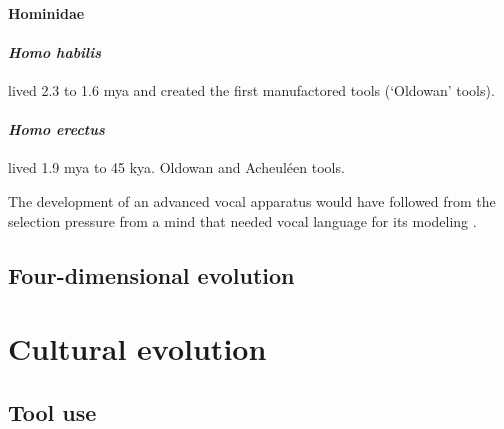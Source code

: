 \documentclass{article}
\begin{document}
\paragraph{Hominidae}

\paragraph{\textit{Homo habilis}} lived 2.3 to 1.6 mya and created the first manufactored tools (`Oldowan' tools).

\paragraph{\textit{Homo erectus}} lived 1.9 mya to 45 kya.
Oldowan and Acheuléen tools.

The development of an advanced vocal apparatus would have followed from the selection pressure from a mind that needed vocal language for its modeling \citep[p.220]{donald1991}.

\subsection{Four-dimensional evolution}

\citet{jablonka2007}


\section{Cultural evolution}
\label{sec:cultural_evolution}

\subsection{Tool use}
\label{sec:tool-use}







\makeindex
\end{document}
